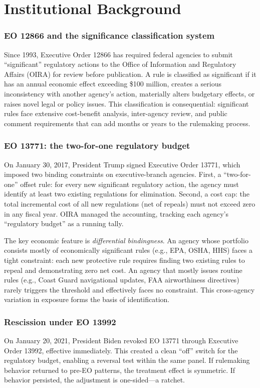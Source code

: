 \documentclass[12pt]{article}
\begin{document}
\section{Institutional Background}

\subsubsection*{EO 12866 and the significance classification system} Since 1993, Executive Order 12866 has required federal agencies to submit ``significant'' regulatory actions to the Office of Information and Regulatory Affairs (OIRA) for review before publication. A rule is classified as significant if it has an annual economic effect exceeding \$100 million, creates a serious inconsistency with another agency's action, materially alters budgetary effects, or raises novel legal or policy issues. This classification is consequential: significant rules face extensive cost-benefit analysis, inter-agency review, and public comment requirements that can add months or years to the rulemaking process.

\subsubsection*{EO 13771: the two-for-one regulatory budget} On January 30, 2017, President Trump signed Executive Order 13771, which imposed two binding constraints on executive-branch agencies. First, a ``two-for-one'' offset rule: for every new significant regulatory action, the agency must identify at least two existing regulations for elimination. Second, a cost cap: the total incremental cost of all new regulations (net of repeals) must not exceed zero in any fiscal year. OIRA managed the accounting, tracking each agency's ``regulatory budget'' as a running tally.

The key economic feature is \textit{differential bindingness}. An agency whose portfolio consists mostly of economically significant rules (e.g., EPA, OSHA, HHS) faces a tight constraint: each new protective rule requires finding two existing rules to repeal and demonstrating zero net cost. An agency that mostly issues routine rules (e.g., Coast Guard navigational updates, FAA airworthiness directives) rarely triggers the threshold and effectively faces no constraint. This cross-agency variation in exposure forms the basis of identification.

\subsubsection*{Rescission under EO 13992} On January 20, 2021, President Biden revoked EO 13771 through Executive Order 13992, effective immediately. This created a clean ``off'' switch for the regulatory budget, enabling a reversal test within the same panel. If rulemaking behavior returned to pre-EO patterns, the treatment effect is symmetric. If behavior persisted, the adjustment is one-sided---a ratchet.
\end{document}
